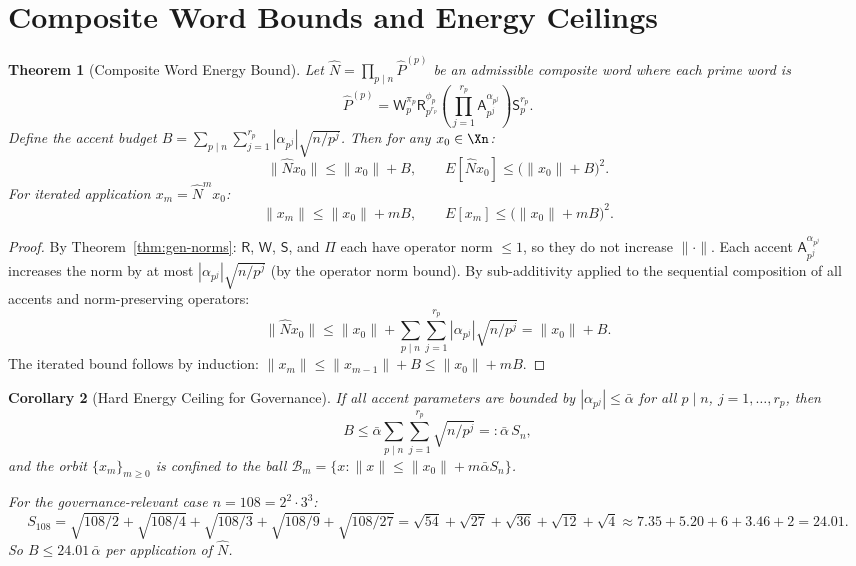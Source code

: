 \documentclass[11pt]{amsart}
\newtheorem{theorem}{Theorem}[section]
\newtheorem{corollary}[theorem]{Corollary}
\newcommand{\Prj}{\Pi}
\newcommand{\Sp}{\mathsf{S}}
\newcommand{\Ap}{\mathsf{A}}
\newcommand{\Rp}{\mathsf{R}}
\newcommand{\Wp}{\mathsf{W}}
\newcommand{\bN}{\widehat{N}}
\newcommand{\norm}[1]{\lVert #1 \rVert}
\begin{document}
\section{Composite Word Bounds and Energy Ceilings}
\label{sec:composite}

\begin{theorem}[Composite Word Energy Bound]\label{thm:composite-energy}
Let $\bN = \prod_{p \mid n} \hat{P}^{(p)}$ be an admissible composite word where each prime word is
\[
  \hat{P}^{(p)} = \Wp^{\pi_p}_p \Rp^{\phi_p}_{p^{r_p}} \left(\prod_{j=1}^{r_p} \Ap^{\alpha_{p^j}}_{p^j}\right) \Sp^{r_p}_p.
\]
Define the \emph{accent budget} $B = \sum_{p \mid n}\sum_{j=1}^{r_p} |\alpha_{p^j}|\sqrt{n/p^j}$. Then for any $x_0 \in \Xn$:
\[
  \norm{\bN x_0} \leq \norm{x_0} + B, \qquad E[\bN x_0] \leq \bigl(\norm{x_0} + B\bigr)^2.
\]
For iterated application $x_m = \bN^m x_0$:
\[
  \norm{x_m} \leq \norm{x_0} + mB, \qquad E[x_m] \leq \bigl(\norm{x_0} + mB\bigr)^2.
\]
\end{theorem}

\begin{proof}
By Theorem~\ref{thm:gen-norms}: $\Rp$, $\Wp$, $\Sp$, and $\Prj$ each have operator norm $\leq 1$, so they do not increase $\norm{\cdot}$. Each accent $\Ap^{\alpha_{p^j}}_{p^j}$ increases the norm by at most $|\alpha_{p^j}|\sqrt{n/p^j}$ (by the operator norm bound). By sub-additivity applied to the sequential composition of all accents and norm-preserving operators:
\[
  \norm{\bN x_0} \leq \norm{x_0} + \sum_{p \mid n}\sum_{j=1}^{r_p} |\alpha_{p^j}|\sqrt{n/p^j} = \norm{x_0} + B.
\]
The iterated bound follows by induction: $\norm{x_m} \leq \norm{x_{m-1}} + B \leq \norm{x_0} + mB$.
\end{proof}

\begin{corollary}[Hard Energy Ceiling for Governance]\label{cor:energy-ceiling}
If all accent parameters are bounded by $|\alpha_{p^j}| \leq \bar{\alpha}$ for all $p \mid n$, $j = 1, \ldots, r_p$, then
\[
  B \leq \bar{\alpha} \sum_{p \mid n}\sum_{j=1}^{r_p} \sqrt{n/p^j} =: \bar{\alpha}\, S_n,
\]
and the orbit $\{x_m\}_{m \geq 0}$ is confined to the ball $\mathcal{B}_m = \bigl\{x : \norm{x} \leq \norm{x_0} + m\bar{\alpha} S_n\bigr\}$.

For the governance-relevant case $n = 108 = 2^2 \cdot 3^3$:
\[
  S_{108} = \sqrt{108/2} + \sqrt{108/4} + \sqrt{108/3} + \sqrt{108/9} + \sqrt{108/27}
  = \sqrt{54} + \sqrt{27} + \sqrt{36} + \sqrt{12} + \sqrt{4}
  \approx 7.35 + 5.20 + 6 + 3.46 + 2 = 24.01.
\]
So $B \leq 24.01\,\bar{\alpha}$ per application of $\bN$.
\end{corollary}
\end{document}
